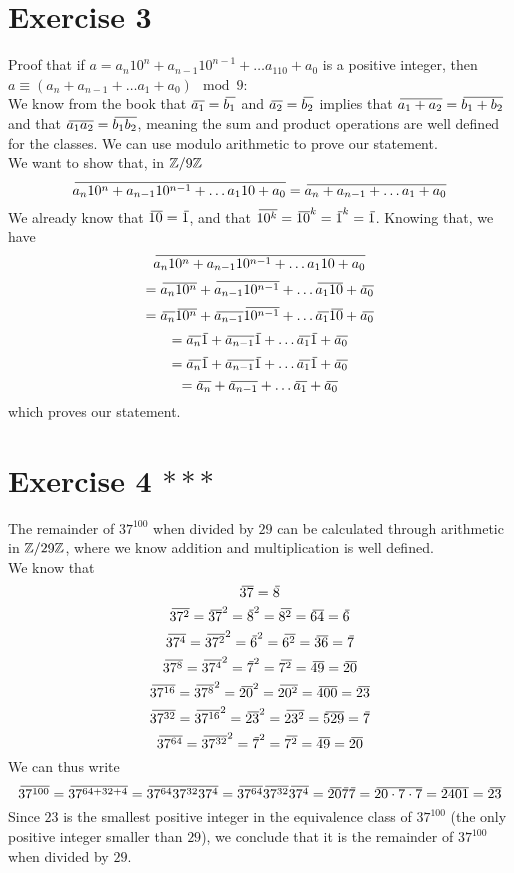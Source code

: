 \documentclass[12pt]{article}
\begin{document}
    \section*{Exercise 3}
    Proof that if $a = a_n10^n + a_{n-1}10^{n-1} + \dots a_110 + a_0$
    is a positive integer,
    then $a \equiv (a_n + a_{n-1} + \dots a_1 + a_0) \mod 9$: \\
    We know from the book that $\,\overline{\!{a_1}} = \,\overline{\!{b_1}}$
    and $\,\overline{\!{a_2}} = \,\overline{\!{b_2}}$
    implies that $\,\overline{\!{a_1+a_2}} = \,\overline{\!{b_1 + b_2}}$
    and that $\,\overline{\!{a_1a_2}} = \,\overline{\!{b_1b_2}}$,
    meaning the sum and product operations are well defined
    for the classes.
    We can use modulo arithmetic to prove our statement. \\
    We want to show that, in $\mathbb{Z}/9\mathbb{Z}$
    \[  \,\overline{\!{a_n10^n + a_{n-1}10^{n-1} + \dots a_110 + a_0}}
    = \,\overline{\!{a_n + a_{n-1} + \dots a_1 + a_0}} \]
    We already know that $\,\overline{\!{10}} = \,\overline{\!{1}}$,
    and that $\,\overline{\!{10^k}} = \,\overline{\!{10}}^k = \,\overline{\!{1}}^k = \,\overline{\!{1}}$.
    Knowing that, we have
    \[  \,\overline{\!{a_n10^n + a_{n-1}10^{n-1} + \dots a_110 + a_0}} \]
    \[ = \,\overline{\!{a_n10^n}} +  \,\overline{\!{a_{n-1}10^{n-1}}}
    + \dots  \,\overline{\!{a_110}} +  \,\overline{\!{a_0}} \]
    \[ = \,\overline{\!{a_n}}\,\overline{\!{10^n}} +  \,\overline{\!{a_{n-1}}}\,\overline{\!{10^{n-1}}}
    + \dots  \,\overline{\!{a_1}}\,\overline{\!{10}} +  \,\overline{\!{a_0}} \]
    \[ = \,\overline{\!{a_n}}\,\overline{\!{1}} +  \,\overline{\!{a_{n-1}}}\,\overline{\!{1}}
    + \dots  \,\overline{\!{a_1}}\,\overline{\!{1}} +  \,\overline{\!{a_0}} \]
    \[ = \,\overline{\!{a_n}}\,\overline{\!{1}} +  \,\overline{\!{a_{n-1}}}\,\overline{\!{1}}
    + \dots  \,\overline{\!{a_1}}\,\overline{\!{1}} +  \,\overline{\!{a_0}} \]
    \[ = \,\overline{\!{a_n}} +  \,\overline{\!{a_{n-1}}}
    + \dots  \,\overline{\!{a_1}} +  \,\overline{\!{a_0}} \]
    which proves our statement. \\

    \section*{Exercise 4 $***$}
    The remainder of $37^{100}$ when divided by $29$
    can be calculated through arithmetic in $\mathbb{Z}/29\mathbb{Z}$,
    where we know addition and multiplication is well defined. \\
    We know that
    \[ \,\overline{\!{37}} = \,\overline{\!{8}} \]
    \[ \,\overline{\!{37^2}} = \,\overline{\!{37}}^2 = \,\overline{\!{8}}^2
    = \,\overline{\!{8^2}} = \,\overline{\!{64}} = \,\overline{\!{6}} \]
    \[ \,\overline{\!{37^4}} = \,\overline{\!{37^2}}^2 = \,\overline{\!{6}}^2
    = \,\overline{\!{6^2}} = \,\overline{\!{36}} = \,\overline{\!{7}} \]
    \[ \,\overline{\!{37^8}} = \,\overline{\!{37^4}}^2 = \,\overline{\!{7}}^2
    = \,\overline{\!{7^2}} = \,\overline{\!{49}} = \,\overline{\!{20}} \]
    \[ \,\overline{\!{37^{16}}} = \,\overline{\!{37^8}}^2 = \,\overline{\!{20}}^2
    = \,\overline{\!{20^2}} = \,\overline{\!{400}} = \,\overline{\!{23}} \]
    \[ \,\overline{\!{37^{32}}} = \,\overline{\!{37^{16}}}^2 = \,\overline{\!{23}}^2
    = \,\overline{\!{23^2}} = \,\overline{\!{529}} = \,\overline{\!{7}} \]
    \[ \,\overline{\!{37^{64}}} = \,\overline{\!{37^{32}}}^2 = \,\overline{\!{7}}^2
    = \,\overline{\!{7^2}} = \,\overline{\!{49}} = \,\overline{\!{20}} \]
    We can thus write
    \[ \olsi{37^{100}} = \olsi{37^{64 + 32 + 4}}
    = \olsi{37^{64}37^{32}37^{4}}
    = \olsi{37^{64}}\olsi{37^{32}}\olsi{37^{4}} 
    = \olsi{20}\olsi{7}\olsi{7}
    = \olsi{20 \cdot 7 \cdot 7}
    = \olsi{2401} = \olsi{23} \]
    Since $23$ is the smallest positive integer in the equivalence
    class of $37^{100}$
    (the only positive integer smaller than $29$),
    we conclude that it is the remainder of $37^{100}$
    when divided by $29$. \\
\end{document}
